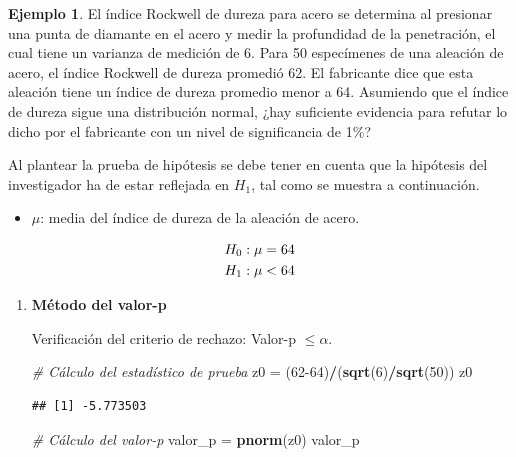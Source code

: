 \documentclass[
  11pt,
]{book}
\newenvironment{Shaded}{\begin{snugshade}}{\end{snugshade}}
\newcommand{\CommentTok}[1]{\textcolor[rgb]{0.56,0.35,0.01}{\textit{#1}}}
\newcommand{\DecValTok}[1]{\textcolor[rgb]{0.00,0.00,0.81}{#1}}
\newcommand{\FunctionTok}[1]{\textcolor[rgb]{0.13,0.29,0.53}{\textbf{#1}}}
\newcommand{\NormalTok}[1]{#1}
\newcommand{\OtherTok}[1]{\textcolor[rgb]{0.56,0.35,0.01}{#1}}
\newcommand{\SpecialCharTok}[1]{\textcolor[rgb]{0.81,0.36,0.00}{\textbf{#1}}}
\providecommand{\tightlist}{%
  \setlength{\itemsep}{0pt}\setlength{\parskip}{0pt}}
\theoremstyle{definition}
\theoremstyle{definition}
\newtheorem{example}{Ejemplo}[chapter]
\theoremstyle{definition}
\theoremstyle{definition}
\theoremstyle{remark}
\begin{document}
\begin{example}

El índice Rockwell de dureza para acero se determina al presionar una punta de diamante en el acero y medir la profundidad de la penetración, el cual tiene un varianza de medición de 6. Para 50 especímenes de una aleación de acero, el índice Rockwell de dureza promedió 62. El fabricante dice que esta aleación tiene un índice de dureza promedio menor a 64. Asumiendo que el índice de dureza sigue una distribución normal, ¿hay suficiente evidencia para refutar lo dicho por el fabricante con un nivel de significancia de 1\%?

Al plantear la prueba de hipótesis se debe tener en cuenta que la hipótesis del investigador ha de estar reflejada en \(H_1\), tal como se muestra a continuación.

\begin{itemize}
\tightlist
\item
  \(\mu\): media del índice de dureza de la aleación de acero.
\end{itemize}

\begin{equation}
\notag
\begin{split}
H_0&: \mu = 64\\
H_1&: \mu < 64
\end{split}
\end{equation}

\begin{enumerate}
\def\labelenumi{\arabic{enumi}.}
\item
  \textbf{Método del valor-p}

  Verificación del criterio de rechazo: Valor-p \(\leq \alpha\).

\begin{Shaded}
\begin{Highlighting}[]
\CommentTok{\# Cálculo del estadístico de prueba}
\NormalTok{z0 }\OtherTok{=}\NormalTok{ (}\DecValTok{62{-}64}\NormalTok{)}\SpecialCharTok{/}\NormalTok{(}\FunctionTok{sqrt}\NormalTok{(}\DecValTok{6}\NormalTok{)}\SpecialCharTok{/}\FunctionTok{sqrt}\NormalTok{(}\DecValTok{50}\NormalTok{))}
\NormalTok{z0}
\end{Highlighting}
\end{Shaded}

\begin{verbatim}
## [1] -5.773503
\end{verbatim}

\begin{Shaded}
\begin{Highlighting}[]
\CommentTok{\# Cálculo del valor{-}p}
\NormalTok{valor\_p }\OtherTok{=} \FunctionTok{pnorm}\NormalTok{(z0)}
\NormalTok{valor\_p}
\end{Highlighting}
\end{Shaded}


\end{enumerate}
\end{example}
\end{document}

